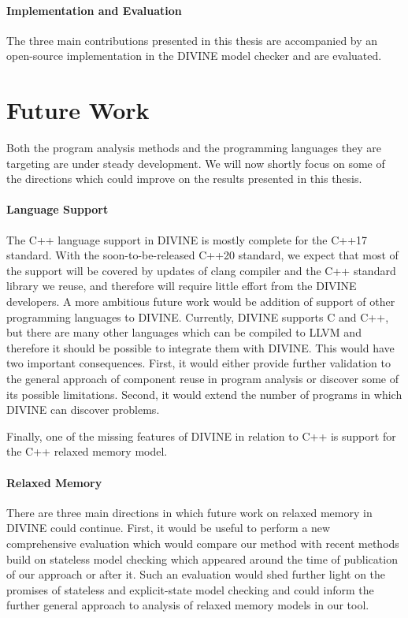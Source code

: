 \paragraph{Implementation and Evaluation}

The three main contributions presented in this thesis are accompanied by an open-source implementation in the DIVINE model checker and are evaluated.

\section{Future Work}

Both the program analysis methods and the programming languages they are targeting are under steady development.
We will now shortly focus on some of the directions which could improve on the results presented in this thesis.

\paragraph{Language Support}

The C++ language support in DIVINE is mostly complete for the C++17 standard.
With the soon-to-be-released C++20 standard, we expect that most of the support will be covered by updates of clang compiler and the C++ standard library we reuse, and therefore will require little effort from the DIVINE developers.
A more ambitious future work would be addition of support of other programming languages to DIVINE.
Currently, DIVINE supports C and C++, but there are many other languages which can be compiled to LLVM and therefore it should be possible to integrate them with DIVINE.
This would have two important consequences.
First, it would either provide further validation to the general approach of component reuse in program analysis or discover some of its possible limitations.
Second, it would extend the number of programs in which DIVINE can discover problems.

Finally, one of the missing features of DIVINE in relation to C++ is support for the C++ relaxed memory model.

\paragraph{Relaxed Memory}

There are three main directions in which future work on relaxed memory in DIVINE could continue.
First, it would be useful to perform a new comprehensive evaluation which would compare our method with recent methods build on stateless model checking which appeared around the time of publication of our approach or after it.
Such an evaluation would shed further light on the promises of stateless and explicit-state model checking and could inform the further general approach to analysis of relaxed memory models in our tool.

